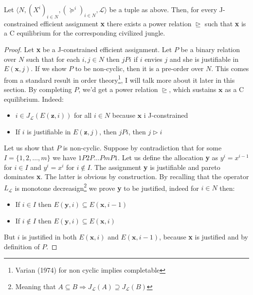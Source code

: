 

\begin{theorem}
    Let $\langle N,(X^i)_{i\in N}, (\succeq^i)_{i\in N}, \mathcal{L}\rangle$ be a tuple as above. Then, for every J-constrained efficient assignment \textbf{x} there exists a power relation $\trianglerighteq$ such that \textbf{x} is a C equilibrium for the corresponding civilized jungle. 

    \begin{proof}
        Let \textbf{x} be a J-constrained efficient assignment. Let $P$ be a binary relation over $N$ such that for each $i,j\in N$ then $jPi$ if $i$ envies $j$ and she is justifiable in $E(\textbf{x},j)$. If we show $P$ to be non-cyclic, then it is a pre-order over $N$. This comes from a standard result in order theory\footnote{Varian (1974) for non cyclic implies completable}, I will talk more about it later in this section. By completing $P$, we'd get a power relation $\trianglerighteq$, which sustains $\textbf{x}$ as a C equilibrium. Indeed:
        \begin{itemize}
            \item $i\in J_{\mathcal{L}}(E(\textbf{z},i))$ for all $i\in N$ because $\textbf{x}$ i J-constrained
            \item If $i$ is justifiable in $E(\textbf{z},j)$, then $jPi$, then $j\triangleright i$
        \end{itemize}

        Let us show that $P$ is non-cyclic. Suppose by contradiction that for some $I=\{1,2,\dots,m\}$ we have $1P2P\dots PmP1$. Let us define the allocation \textbf{y} as $y^i=x^{i-1}$ for $i\in I$ and $y^i=x^i$ for $i\notin I$. The assignment \textbf{y} is justifiable and pareto dominates \textbf{x}. The latter is obvious by construction. By recalling that the operator $L_{\mathcal{L}}$ is monotone decreasign\footnote{Meaning that $A\subseteq B\Rightarrow J_{\mathcal{L}}(A)\supseteq J_{\mathcal{L}}(B)$} we prove \textbf{y} to be justified, indeed for $i\in N$ then:
        \begin{itemize}
            \item If $i\in I$ then $E(\textbf{y},i)\subseteq E(\textbf{x},i-1)$ 
            \item If $i\notin I$ then $E(\textbf{y},i)\subseteq E(\textbf{x},i)$
        \end{itemize}

        But $i$ is justified in both $E(\textbf{x},i)$ and $E(\textbf{x},i-1)$, because \textbf{x} is justified and by definition of $P$.
    \end{proof}
\end{theorem}


